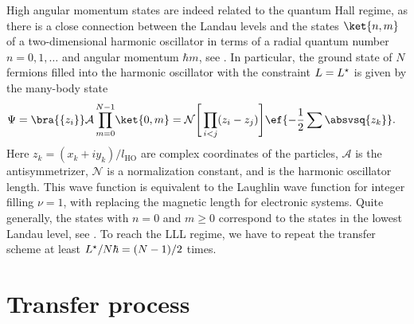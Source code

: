 High angular momentum states are indeed related to the quantum Hall regime, as there is a close connection between the Landau levels and the states $\ket{n,m}$ of a two-dimensional harmonic oscillator in terms of a radial quantum number $n=0,1,\dots$ and angular momentum $\hbar m$, see . In particular, the ground state of $N$ fermions filled into the harmonic oscillator with the constraint $L=L^{\star}$ is given by the many-body state
\begin{align*}
\Psi&= \bra{\{z_i\}}\mathcal{A} \prod_{m=0}^{N-1} \!\ket{0,m} = \mathcal{N}\Bigg[\prod_{i<j} (z_i-z_j) \Bigg] \ef{-\frac{1}{2}\sum\absvsq{z_k}}.
\end{align*}
Here $z_k=(x_k+i y_k)/l_\text{HO}$ are complex coordinates of the particles, $\mathcal{A}$ is the antisymmetrizer, $\mathcal{N}$ is a normalization constant, and  is the harmonic oscillator length. This wave function is equivalent to the Laughlin wave function for integer filling $\nu=1$, with    replacing the magnetic length  for electronic systems. Quite generally, the states with $n=0$ and $m\ge 0$ correspond to the states in the lowest Landau level, see .
To reach the LLL regime, we have to repeat the transfer scheme at least $L^{\star}/N\hbar=(N-1)/2$ times.

\section{Transfer process}

